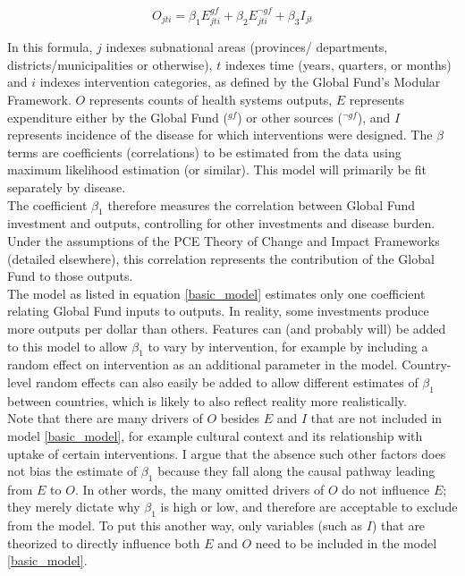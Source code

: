 \documentclass[twocolumn]{bmcart}%
\begin{document}
\begin{equation} \label{basic_model}
O_{jti} = \beta_1 E^{gf}_{jti} + \beta_2 E^{\neg gf}_{jti} + \beta_3 I_{jt}
\end{equation}

In this formula, $j$ indexes subnational areas (provinces/ departments, districts/municipalities or otherwise), $t$ indexes time (years, quarters, or months) and $i$ indexes intervention categories, as defined by the Global Fund's Modular Framework. $O$ represents counts of health systems outputs, $E$ represents expenditure either by the Global Fund ($^{gf}$) or other sources ($^{\neg gf}$), and $I$ represents incidence of the disease for which interventions were designed. The $\beta$ terms are coefficients (correlations) to be estimated from the data using maximum likelihood estimation (or similar). This model will primarily be fit separately by disease.\\

The coefficient $\beta_1$ therefore measures the correlation between Global Fund investment and outputs, controlling for other investments and disease burden. Under the assumptions of the PCE Theory of Change and Impact Frameworks (detailed elsewhere), this correlation represents the contribution of the Global Fund to those outputs. \\

The model as listed in equation \ref{basic_model} estimates only one coefficient relating Global Fund inputs to outputs. In reality, some investments produce more outputs per dollar than others. Features can (and probably will) be added to this model to allow $\beta_1$ to vary by intervention, for example by including a random effect on intervention as an additional parameter in the model. Country-level random effects can also easily be added to allow different estimates of $\beta_1$ between countries, which is likely to also reflect reality more realistically. \\

Note that there are many drivers of $O$ besides $E$ and $I$ that are not included in model \ref{basic_model}, for example cultural context and its relationship with uptake of certain interventions. I argue that the absence such other factors does not bias the estimate of $\beta_1$ because they fall along the causal pathway leading from $E$ to $O$. In other words, the many omitted drivers of $O$ do not influence $E$; they merely dictate why $\beta_1$ is high or low, and therefore are acceptable to exclude from the model. To put this another way, only variables (such as $I$) that are theorized to directly influence both $E$ and $O$ need to be included in the model \ref{basic_model}.
\end{document}
